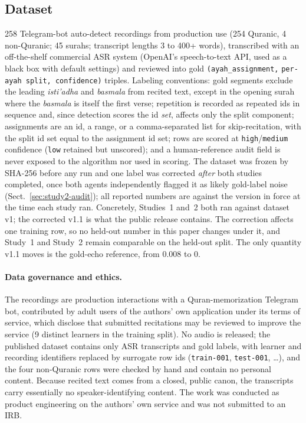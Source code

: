 \documentclass[runningheads]{llncs}
\begin{document}
\subsection{Dataset}
258 Telegram-bot auto-detect recordings from production use (254 Quranic,
4 non-Quranic; 45 surahs; transcript lengths 3 to 400+ words), transcribed
with an off-the-shelf commercial ASR system (OpenAI's speech-to-text API,
used as a black box with default settings) and reviewed into gold
\mbox{\texttt{(ayah\_assignment,}} \texttt{per-ayah split, confidence)}
triples. Labeling
conventions: gold segments exclude the leading \emph{isti'adha} and
\emph{basmala} from recited text, except in the opening surah where the
\emph{basmala} is itself the first verse; repetition is recorded as
repeated ids in sequence and, since detection scores the id \emph{set},
affects only the split component; assignments are an id, a range, or a
comma-separated list for skip-recitation, with the split id set equal to
the assignment id set; rows are scored at \texttt{high}/\texttt{medium}
confidence (\texttt{low} retained but unscored); and a human-reference
audit field is never exposed to the algorithm nor used in scoring. The
dataset was frozen by SHA-256 before any run
and one label was corrected \emph{after} both studies completed, once both
agents independently flagged it as likely gold-label noise
(Sect.~\ref{sec:study2-audit}); all reported numbers are against the version
in force at the time each study ran. Concretely, Studies~1 and~2 both ran
against dataset v1; the corrected v1.1 is what the public release contains.
The correction affects one training row, so no held-out number in this paper
changes under it, and Study~1 and Study~2 remain comparable on the held-out
split. The only quantity v1.1 moves is the gold-echo reference, from
$0.008$ to $0$.

\paragraph{Data governance and ethics.} The recordings are production
interactions with a Quran-memorization Telegram bot, contributed by adult
users of the authors' own application under its terms of service, which
disclose that submitted recitations may be reviewed to improve the service
(9 distinct learners in the training split). No audio is released; the
published dataset contains only ASR transcripts and gold labels, with
learner and recording identifiers replaced by surrogate row ids
(\texttt{train-001}, \texttt{test-001}, \ldots), and the four non-Quranic
rows were checked by hand and contain no personal content. Because recited
text comes from a closed, public canon, the transcripts carry essentially no
speaker-identifying content. The work was conducted as product engineering
on the authors' own service and was not submitted to an IRB.
\end{document}
